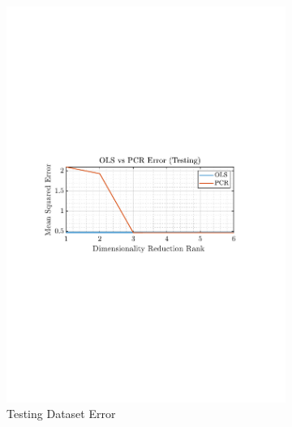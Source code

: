 \documentclass[12pt]{article}
\begin{document}
\begin{figure}[H]
\begin{subfigure}{0.49\textwidth}
 			\includegraphics[trim={2.2cm 11.2cm 3.15cm  11.2cm}, clip, width=\textwidth]{../MATLAB/figures/q1_6c_fig02.pdf} 
 			\captionsetup{justification=centering}
 			\caption{Testing Dataset Error}
 		\end{subfigure}
 		\captionsetup{justification=centering}
 		\caption{}
 		\label{fig: 1-6c}
 	\end{figure}
\end{document}
